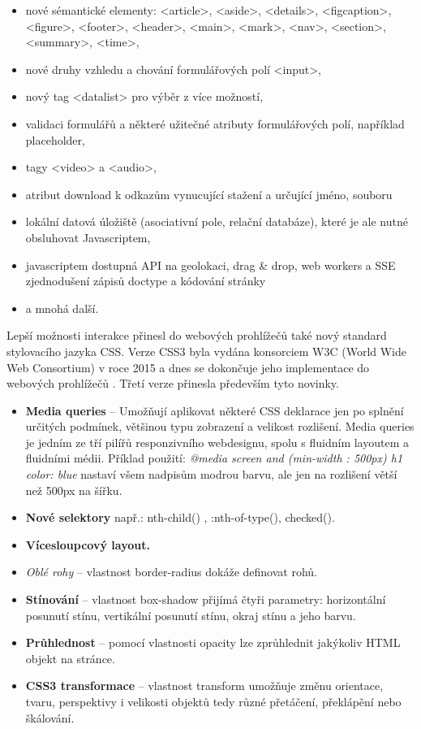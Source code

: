 \begin{itemize}
\item nové sémantické elementy: <article>, <aside>, <details>, <figcaption>, <figure>, <footer>, <header>, <main>, <mark>, <nav>, <section>, <summary>, <time>,
\item nové druhy vzhledu a chování formulářových polí <input>,
\item nový tag <datalist> pro výběr z více možností,
\item validaci formulářů a některé užitečné atributy formulářových polí, například placeholder,
\item tagy <video> a <audio>,
\item atribut download k odkazům vynucující stažení a určující jméno, souboru
\item lokální datová úložiště (asociativní pole, relační databáze), které je ale nutné obsluhovat Javascriptem,
\item javascriptem dostupná API na geolokaci, drag \& drop, web workers a SSE zjednodušení zápisů doctype a kódování stránky\
\item a mnohá další.
\end{itemize}

Lepší možnosti interakce přinesl do webových prohlížečů také nový standard stylovacího jazyka CSS. Verze CSS3 byla vydána konsorciem W3C (World Wide Web Consortium) v roce 2015 a dnes se dokončuje jeho implementace do webových prohlížečů \cite{css3} \cite{html5_css3_book}. Třetí verze přinesla především tyto novinky.

\begin{itemize}
\item \textbf{Media queries} – Umožňují aplikovat některé CSS deklarace jen po splnění určitých podmínek, většinou typu zobrazení a velikost rozlišení. Media queries je jedním ze tří pilířů responzivního webdesignu, spolu s fluidním layoutem a fluidními médii. Příklad použití: \textit{@media screen and (min-width : 500px) {h1 {color: blue}}} nastaví všem nadpisům modrou barvu, ale jen na rozlišení větší než 500px na šířku. 
\item \textbf{Nové selektory }např.: nth-child() , :nth-of-type(), checked().
\item \textbf{Vícesloupcový layout.}
\item \textit{Oblé rohy} – vlastnost border-radius dokáže definovat  rohů.
\item \textbf{Stínování} – vlastnost box-shadow přijímá čtyři parametry: horizontální posunutí stínu, vertikální posunutí stínu, okraj stínu a jeho barvu.
\item \textbf{Průhlednost} – pomocí vlastnosti opacity lze zprůhlednit jakýkoliv HTML objekt na stránce.
\item \textbf{CSS3 transformace} – vlastnost transform umožňuje změnu orientace, tvaru, perspektivy i velikosti objektů tedy různé přetáčení, překlápění nebo škálování.
\end{itemize}


